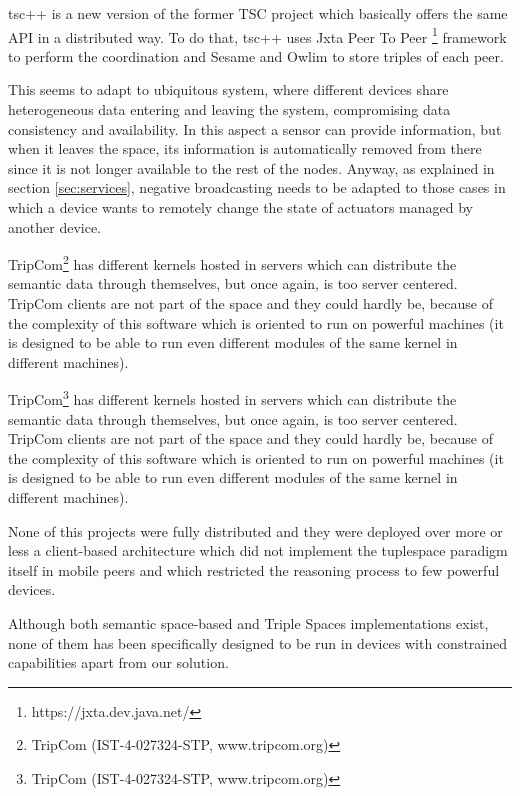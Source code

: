 tsc++ \cite{krummenacher_open_2009} is a new version of the former TSC project\cite{fensel_triple-space_2004} which basically offers
the same API in a distributed way. To do that, tsc++ uses Jxta Peer To Peer \footnote{https://jxta.dev.java.net/} framework to perform the
coordination and Sesame \cite{broekstra_sesame:_2002} and Owlim \cite{kiryakov_owlimpragmatic_2005} to store triples of each peer.

This seems to adapt to
ubiquitous system, where different devices share heterogeneous data entering and leaving the system, compromising data consistency
and availability. In this aspect a sensor can provide information, but when it leaves the space, its information is automatically
removed from there since it is not longer available to the rest of the nodes. Anyway, as explained in section \ref{sec:services},
negative broadcasting needs to be adapted to those cases in which a device wants to remotely change the state of actuators managed
by another device.


TripCom\footnote{TripCom (IST-4-027324-STP, www.tripcom.org)} has different kernels hosted in servers which can distribute the semantic data
through themselves, but once again, is too server centered. TripCom clients are not part of the space and they could hardly be, because of
the complexity of this software which is oriented to run on powerful machines (it is designed to be able to run even different modules of the
same kernel in different machines).

TripCom\footnote{TripCom (IST-4-027324-STP, www.tripcom.org)} has different kernels hosted in servers which can distribute the semantic data
through themselves, but once again, is too server centered. TripCom clients are not part of the space and they could hardly be, because of
the complexity of this software which is oriented to run on powerful machines (it is designed to be able to run even different modules of the
same kernel in different machines).

None of this projects were fully distributed and they were deployed over more or less a client-based architecture which did not implement the tuplespace paradigm itself in mobile peers and which restricted the reasoning process to few powerful devices.




Although both semantic space-based and Triple Spaces implementations exist, none of them has been specifically designed to be run in devices with constrained capabilities apart from our solution.